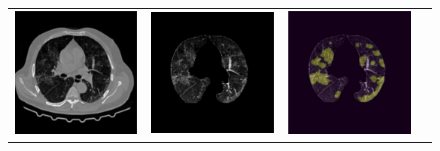 \begin{figure}
\begin{tabular}{c c c c}
    \includegraphics[scale=0.46]{images/Result3-27-ct.jpg} & \!\!
    \includegraphics[scale=0.47]{images/Result3-27-extracted.jpg} & \!\!
    \includegraphics[scale=0.47]{images/Result3-27-unet.jpg} & \!\!

\end{tabular}
\end{figure}
